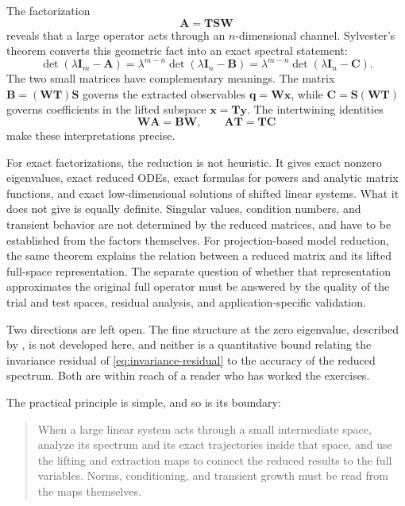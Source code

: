 \documentclass[11pt]{article}
\newcommand{\I}{\mathbf{I}}
\newcommand{\mat}[1]{\mathbf{#1}}
\newcommand{\vect}[1]{\mathbf{#1}}
\theoremstyle{definition}
\theoremstyle{remark}
\begin{document}
The factorization
\[
  \mat{A}=\mat{T}\mat{S}\mat{W}
\]
reveals that a large operator acts through an \(n\)-dimensional channel. Sylvester's theorem converts this geometric fact into an exact spectral statement:
\[
  \det(\lambda\I_m-\mat{A})
  =\lambda^{m-n}
   \det(\lambda\I_n-\mat{B})
  =\lambda^{m-n}
   \det(\lambda\I_n-\mat{C}).
\]
The two small matrices have complementary meanings. The matrix
\(\mat{B}=(\mat{W}\mat{T})\mat{S}\) governs the extracted observables
\(\vect{q}=\mat{W}\vect{x}\), while
\(\mat{C}=\mat{S}(\mat{W}\mat{T})\) governs coefficients in the lifted subspace
\(\vect{x}=\mat{T}\vect{y}\). The intertwining identities
\[
  \mat{W}\mat{A}=\mat{B}\mat{W},
  \qquad
  \mat{A}\mat{T}=\mat{T}\mat{C}
\]
make these interpretations precise.

For exact factorizations, the reduction is not heuristic. It gives exact nonzero eigenvalues, exact reduced ODEs, exact formulas for powers and analytic matrix functions, and exact low-dimensional solutions of shifted linear systems. What it does not give is equally definite. Singular values, condition numbers, and transient behavior are not determined by the reduced matrices, and have to be established from the factors themselves. For projection-based model reduction, the same theorem explains the relation between a reduced matrix and its lifted full-space representation. The separate question of whether that representation approximates the original full operator must be answered by the quality of the trial and test spaces, residual analysis, and application-specific validation.

Two directions are left open. The fine structure at the zero eigenvalue, described by \textcite{flanders1951elementary}, is not developed here, and neither is a quantitative bound relating the invariance residual of \cref{eq:invariance-residual} to the accuracy of the reduced spectrum. Both are within reach of a reader who has worked the exercises.

The practical principle is simple, and so is its boundary:
\begin{quote}
When a large linear system acts through a small intermediate space, analyze its spectrum and its exact trajectories inside that space, and use the lifting and extraction maps to connect the reduced results to the full variables. Norms, conditioning, and transient growth must be read from the maps themselves.
\end{quote}

\appendix
{}
\end{document}
